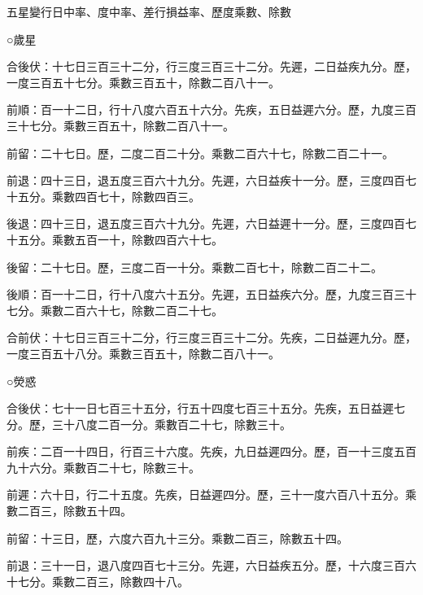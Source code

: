 \begin{pinyinscope}
 五星變行日中率、度中率、差行損益率、歷度乘數、除數



 ○歲星



 合後伏：十七日三百三十二分，行三度三百三十二分。先遲，二日益疾九分。歷，一度三百五十七分。乘數三百五十，除數二百八十一。



 前順：百一十二日，行十八度六百五十六分。先疾，五日益遲六分。歷，九度三百三十七分。乘數三百五十，除數二百八十一。



 前留：二十七日。歷，二度二百二十分。乘數二百六十七，除數二百二十一。



 前退：四十三日，退五度三百六十九分。先遲，六日益疾十一分。歷，三度四百七十五分。乘數四百七十，除數四百三。



 後退：四十三日，退五度三百六十九分。先遲，六日益遲十一分。歷，三度四百七十五分。乘數五百一十，除數四百六十七。



 後留：二十七日。歷，三度二百一十分。乘數二百七十，除數二百二十二。



 後順：百一十二日，行十八度六十五分。先遲，五日益疾六分。歷，九度三百三十七分。乘數二百六十七，除數二百二十七。



 合前伏：十七日三百三十二分，行三度三百三十二分。先疾，二日益遲九分。歷，一度三百五十八分。乘數三百五十，除數二百八十一。



 ○熒惑



 合後伏：七十一日七百三十五分，行五十四度七百三十五分。先疾，五日益遲七分。歷，三十八度二百一分。乘數百二十七，除數三十。



 前疾：二百一十四日，行百三十六度。先疾，九日益遲四分。歷，百一十三度五百九十六分。乘數百二十七，除數三十。



 前遲：六十日，行二十五度。先疾，日益遲四分。歷，三十一度六百八十五分。乘數二百三，除數五十四。



 前留：十三日，歷，六度六百九十三分。乘數二百三，除數五十四。



 前退：三十一日，退八度四百七十三分。先遲，六日益疾五分。歷，十六度三百六十七分。乘數二百三，除數四十八。




\end{pinyinscope}
